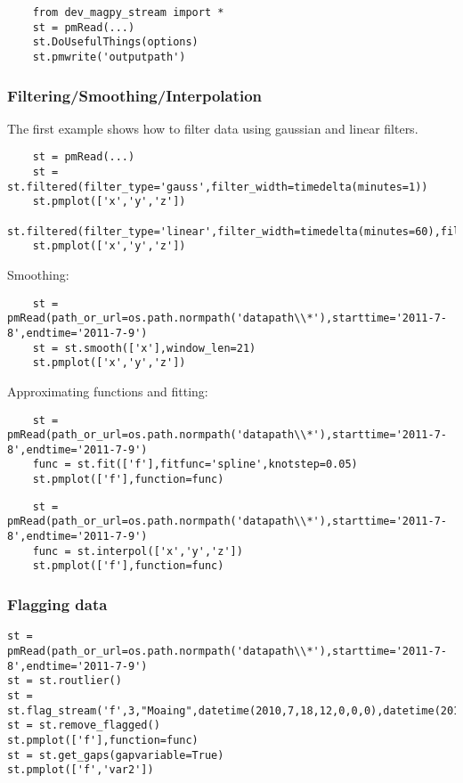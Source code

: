 \begin{verbatim}
    from dev_magpy_stream import *
    st = pmRead(...)
    st.DoUsefulThings(options)
    st.pmwrite('outputpath')
\end{verbatim}

\subsubsection{Filtering/Smoothing/Interpolation}

The first example shows how to filter data using gaussian and linear filters.
\begin{verbatim}
    st = pmRead(...)
    st = st.filtered(filter_type='gauss',filter_width=timedelta(minutes=1))
    st.pmplot(['x','y','z'])
    st.filtered(filter_type='linear',filter_width=timedelta(minutes=60),filter_offset=timedelta(minutes=30))
    st.pmplot(['x','y','z'])
\end{verbatim}

Smoothing:
\begin{verbatim}
    st = pmRead(path_or_url=os.path.normpath('datapath\\*'),starttime='2011-7-8',endtime='2011-7-9')
    st = st.smooth(['x'],window_len=21)
    st.pmplot(['x','y','z'])
\end{verbatim}

Approximating functions and fitting:
\begin{verbatim}
    st = pmRead(path_or_url=os.path.normpath('datapath\\*'),starttime='2011-7-8',endtime='2011-7-9')
    func = st.fit(['f'],fitfunc='spline',knotstep=0.05)
    st.pmplot(['f'],function=func)
\end{verbatim}

\begin{verbatim}
    st = pmRead(path_or_url=os.path.normpath('datapath\\*'),starttime='2011-7-8',endtime='2011-7-9')
    func = st.interpol(['x','y','z'])
    st.pmplot(['f'],function=func)
\end{verbatim}

\subsubsection{Flagging data}

\begin{verbatim}
st = pmRead(path_or_url=os.path.normpath('datapath\\*'),starttime='2011-7-8',endtime='2011-7-9')
st = st.routlier()
st = st.flag_stream('f',3,"Moaing",datetime(2010,7,18,12,0,0,0),datetime(2010,7,18,13,0,0,0))
st = st.remove_flagged()
st.pmplot(['f'],function=func)
st = st.get_gaps(gapvariable=True)
st.pmplot(['f','var2'])
\end{verbatim}


